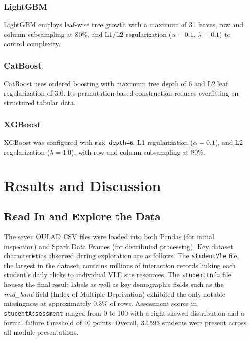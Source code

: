 \documentclass[conference]{IEEEtran}
\begin{document}
\subsubsection{LightGBM}
LightGBM employs leaf-wise tree growth with a maximum of 31 leaves, row and column subsampling at 80\%, and L1/L2 regularization ($\alpha=0.1$, $\lambda=0.1$) to control complexity.

\subsubsection{CatBoost}
CatBoost uses ordered boosting with maximum tree depth of 6 and L2 leaf regularization of 3.0. Its permutation-based construction reduces overfitting on structured tabular data.

\subsubsection{XGBoost}
XGBoost was configured with \texttt{max\_depth=6}, L1 regularization ($\alpha=0.1$), and L2 regularization ($\lambda=1.0$), with row and column subsampling at 80\%.

\section{Results and Discussion}
\label{sec:results}

\subsection{Read In and Explore the Data}
The seven OULAD CSV files were loaded into both Pandas (for initial inspection) and Spark Data Frames (for distributed processing). Key dataset characteristics observed during exploration are as follows. The \texttt{studentVle} file, the largest in the dataset, contains millions of interaction records linking each student's daily clicks to individual VLE site resources. The \texttt{studentInfo} file houses the final result labels as well as key demographic fields such as the \textit{imd\_band} field (Index of Multiple Deprivation) exhibited the only notable missingness at approximately 0.3\% of rows. Assessment scores in \texttt{studentAssessment} ranged from 0 to 100 with a right-skewed distribution and a formal failure threshold of 40 points. Overall, 32{,}593 students were present across all module presentations.
\end{document}
